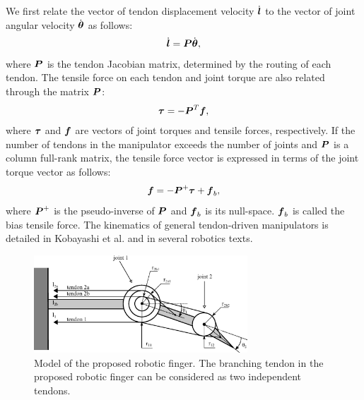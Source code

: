\documentclass{llncs}
\def\vect#1{\mbox{\boldmath$#1$}}
\begin{document}
We first relate the vector of tendon displacement velocity $\dot{\vect{l}}$ to the vector of joint angular velocity $\dot{\vect{\theta}}$ as follows:
\begin{align}
	\dot{\vect{l}}=\vect{P}\dot{\vect{\theta}},
	\label{jaco}
\end{align}
where $\vect{P}$ is the tendon Jacobian matrix, determined by the routing of each tendon.
The tensile force on each tendon and joint torque are also related through the matrix $\vect{P}$:
\begin{align}
	\vect{\tau}=-\vect{P}^{T}\vect{f},
	\label{force_relation}
\end{align}
where $\vect{\tau}$ and $\vect{f}$ are vectors of joint torques and tensile forces, respectively.
If the number of tendons in the manipulator exceeds the number of joints and $\vect{P}$ is a column full-rank matrix,
the tensile force vector is expressed in terms of the joint torque vector as follows:
\begin{align}
	\vect{f} = -\vect{P}^{+}\vect{\tau}+\vect{f}_{b},
	\label{tensile_force}
\end{align}
where $\vect{P}^{+}$ is the pseudo-inverse of $\vect{P}$ and $\vect{f}_{b}$ is its null-space.
$\vect{f}_{b}$ is called the bias tensile force.
The kinematics of general tendon-driven manipulators is detailed in Kobayashi et al.\cite{kobayashi1998}
and in several robotics texts\cite{murrayi1994,tsai1999}.
\begin{figure}[t]
	\centering
	\includegraphics[width=80mm]{fig/slacked.eps}
	\caption{Model of the proposed robotic finger. The branching tendon in the proposed robotic finger can be considered as two independent tendons.}
	\label{nonbranching_model}
\end{figure}
\end{document}

